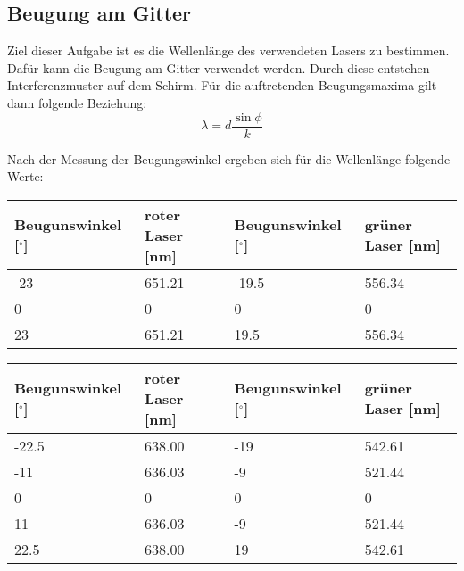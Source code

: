 \subsection{Beugung am Gitter}

Ziel dieser Aufgabe ist es die Wellenlänge des verwendeten Lasers zu bestimmen. Dafür kann die Beugung am Gitter verwendet werden. Durch diese entstehen Interferenzmuster auf dem Schirm. Für die auftretenden Beugungsmaxima gilt dann folgende Beziehung:
\begin{displaymath}
    \lambda = d\frac{\sin\phi}{k}
\end{displaymath}

\noindent Nach der Messung der Beugungswinkel ergeben sich für die Wellenlänge folgende Werte:

\begin{minipage}{\linewidth}
    \begin{table}[H]
        \centering
    \begin{tabular}{llll}
        \toprule
        Beugunswinkel [$^\circ$] & roter Laser [nm] & Beugunswinkel [$^\circ$] & grüner Laser [nm]  \\
        \midrule
        -23 & 651.21 & -19.5 & 556.34 \\
        0   & 0    & 0     & 0    \\
        23  & 651.21  & 19.5  & 556.34  \\
        \bottomrule   
    \end{tabular}
    
    \label{tab:7}
\end{table}
\end{minipage}

\begin{minipage}{\linewidth}
    \begin{table}[H]
        \centering
    \begin{tabular}{llll}
        \toprule
        Beugunswinkel [$^\circ$] & roter Laser [nm] & Beugunswinkel [$^\circ$] & grüner Laser [nm]  \\
        \midrule
        -22.5 & 638.00 & -19 & 542.61 \\
        -11 & 636.03 & -9 & 521.44 \\
        0   & 0    & 0     & 0    \\
        11  & 636.03 & -9 & 521.44 \\
        22.5  & 638.00  & 19  & 542.61  \\
        \bottomrule   
    \end{tabular}
    
    \label{tab:8}
\end{table}
\end{minipage}

